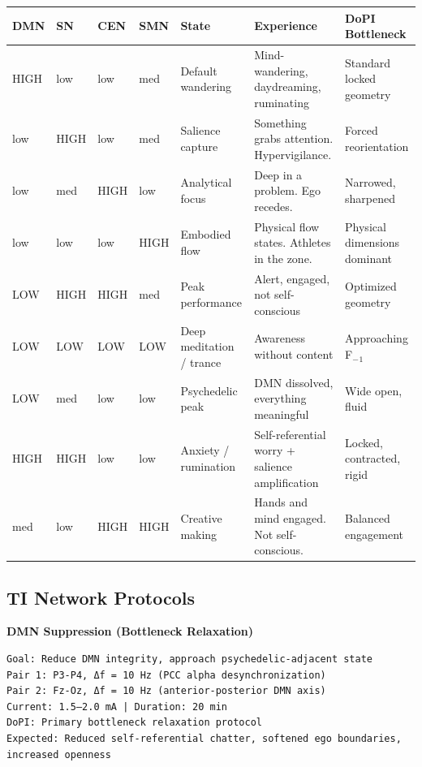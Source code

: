 \begin{longtable}{p{} p{} p{} p{} p{} p{} p{}}
\toprule
\textbf{DMN} & \textbf{SN} & \textbf{CEN} & \textbf{SMN} & \textbf{State} & \textbf{Experience} & \textbf{DoPI Bottleneck} \\
\midrule
\endhead
HIGH & low & low & med & Default wandering & Mind-wandering, daydreaming, ruminating & Standard locked geometry \\
low & HIGH & low & med & Salience capture & Something grabs attention. Hypervigilance. & Forced reorientation \\
low & med & HIGH & low & Analytical focus & Deep in a problem. Ego recedes. & Narrowed, sharpened \\
low & low & low & HIGH & Embodied flow & Physical flow states. Athletes in the zone. & Physical dimensions dominant \\
LOW & HIGH & HIGH & med & Peak performance & Alert, engaged, not self-conscious & Optimized geometry \\
LOW & LOW & LOW & LOW & Deep meditation / trance & Awareness without content & Approaching F$_{-}$$_1$ \\
LOW & med & low & low & Psychedelic peak & DMN dissolved, everything meaningful & Wide open, fluid \\
HIGH & HIGH & low & low & Anxiety / rumination & Self-referential worry + salience amplification & Locked, contracted, rigid \\
med & low & HIGH & HIGH & Creative making & Hands and mind engaged. Not self-conscious. & Balanced engagement \\
\bottomrule
\end{longtable}



\subsection*{TI Network Protocols}


\textbf{DMN Suppression (Bottleneck Relaxation)}

\begin{verbatim}
Goal: Reduce DMN integrity, approach psychedelic-adjacent state
Pair 1: P3-P4, Δf = 10 Hz (PCC alpha desynchronization)
Pair 2: Fz-Oz, Δf = 10 Hz (anterior-posterior DMN axis)
Current: 1.5–2.0 mA | Duration: 20 min
DoPI: Primary bottleneck relaxation protocol
Expected: Reduced self-referential chatter, softened ego boundaries, increased openness
\end{verbatim}


